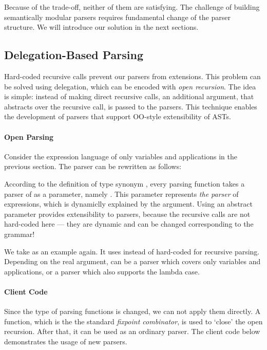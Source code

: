 Because of the trade-off, neither of them are satisfying. The challenge of building semantically modular parsers requires fundamental change of the parser structure. We will introduce our solution in the next sections.

\subsection{Delegation-Based Parsing}\label{subsec:overview-delegation}

Hard-coded recursive calls prevent our parsers from extensions.
This problem can be solved using delegation, which can be encoded with
\textit{open recursion}. The idea is simple: instead of making direct
recursive calls, an additional argument, that abstracts over the
recursive call, is passed to the parsers. This technique enables the
development of parsers that support OO-style extensibility of ASTs.

\paragraph{Open Parsing} Consider the expression language of only variables and applications in the previous section. The parser can be rewritten as follows:


According to the definition of type synonym ,
every parsing function takes a parser of  as a
parameter, namely . This parameter 
represents \emph{the parser} of expressions, which is dynamiclly
explained by the argument. Using an abstract parameter provides
extensibility to parsers, because the recursive calls are not
hard-coded here --- they are dynamic and can be changed corresponding
to the grammar!

We take  as an example again. It uses
 instead of hard-coded  for
recursive parsing. Depending on the real argument, 
can be a parser which covers only variables and applications, or a
parser which also supports the lambda case.

\paragraph{Client Code} Since the type of parsing functions is
changed, we can not apply them directly. A  function, which is the
the standard \textit{fixpoint combinator}, is used to `close' the open
recursion. After that, it can be used as an ordinary parser.
The client code below demonstrates the usage of new parsers.

